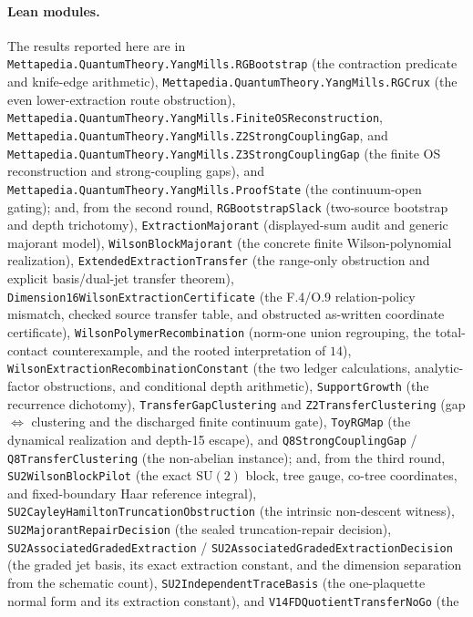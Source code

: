 \documentclass[11pt]{article}
\theoremstyle{definition}
\begin{document}
\paragraph{Lean modules.}
The results reported here are in
\texttt{Mettapedia.QuantumTheory.YangMills.RGBootstrap} (the contraction
predicate and knife-edge arithmetic),
\texttt{Mettapedia.QuantumTheory.YangMills.RGCrux} (the even lower-extraction
route obstruction),
\texttt{Mettapedia.QuantumTheory.YangMills.FiniteOSReconstruction},
\texttt{Mettapedia.QuantumTheory.YangMills.Z2StrongCouplingGap}, and
\texttt{Mettapedia.QuantumTheory.YangMills.Z3StrongCouplingGap} (the finite OS
reconstruction and strong-coupling gaps), and
\texttt{Mettapedia.QuantumTheory.YangMills.ProofState} (the continuum-open
gating); and, from the second round,
\texttt{RGBootstrapSlack} (two-source bootstrap and depth trichotomy),
\texttt{ExtractionMajorant} (displayed-sum audit and generic majorant model),
\texttt{WilsonBlockMajorant} (the concrete finite Wilson-polynomial realization),
\texttt{ExtendedExtractionTransfer} (the range-only obstruction and explicit
basis/dual-jet transfer theorem),
\texttt{Dimension16WilsonExtractionCertificate} (the F.4/O.9 relation-policy
mismatch, checked source transfer table, and obstructed as-written coordinate
certificate),
\texttt{WilsonPolymerRecombination} (norm-one union regrouping, the total-contact
counterexample, and the rooted interpretation of $14$),
\texttt{WilsonExtractionRecombinationConstant} (the two ledger calculations,
analytic-factor obstructions, and conditional depth arithmetic),
\texttt{SupportGrowth} (the recurrence dichotomy),
\texttt{TransferGapClustering} and \texttt{Z2TransferClustering}
(gap $\Leftrightarrow$ clustering and the discharged finite continuum gate),
\texttt{ToyRGMap} (the dynamical realization and depth-15 escape), and
\texttt{Q8StrongCouplingGap} / \texttt{Q8TransferClustering} (the non-abelian
instance); and, from the third round,
\texttt{SU2WilsonBlockPilot} (the exact $\mathrm{SU}(2)$ block, tree gauge,
co-tree coordinates, and fixed-boundary Haar reference integral),
\texttt{SU2CayleyHamiltonTruncationObstruction} (the intrinsic non-descent
witness), \texttt{SU2MajorantRepairDecision} (the sealed truncation-repair
decision), \texttt{SU2AssociatedGradedExtraction} /
\texttt{SU2AssociatedGradedExtractionDecision} (the graded jet basis, its
exact extraction constant, and the dimension separation from the schematic
count), \texttt{SU2IndependentTraceBasis} (the one-plaquette normal form and
its extraction constant), and \texttt{V14FDQuotientTransferNoGo} (the
\end{document}
